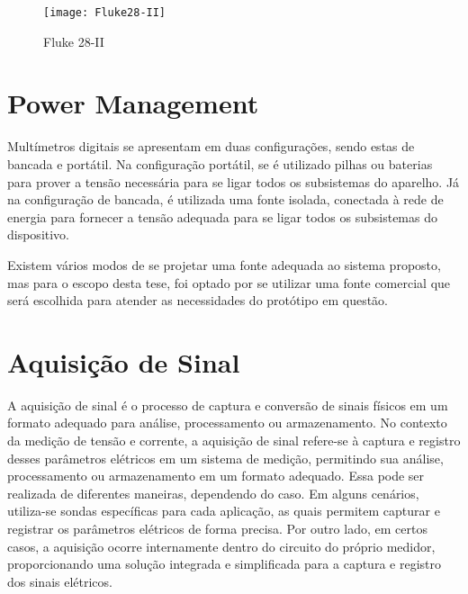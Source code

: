 \begin{figure}[htb]%
    \caption{Fluke 28-II}%
    \label{fig:Fluke28-II}%
    \texttt{[image: Fluke28-II]}%
\end{figure}

\section{Power Management}\label{powerManagement}

Multímetros digitais se apresentam em duas configurações, sendo estas de bancada e portátil. Na configuração portátil, se é utilizado pilhas ou baterias para prover a tensão necessária para se ligar todos os subsistemas do aparelho. Já na configuração de bancada, é utilizada uma fonte isolada, conectada à rede de energia para fornecer a tensão adequada para se ligar todos os subsistemas do dispositivo.

Existem vários modos de se projetar uma fonte adequada ao sistema proposto, mas para o escopo desta tese, foi optado por se utilizar uma fonte comercial que será escolhida para atender as necessidades do protótipo em questão.



\section{Aquisição de Sinal}\label{sec:aqSignal}

A aquisição de sinal é o processo de captura e conversão de sinais físicos em um formato adequado para análise, processamento ou armazenamento. No contexto da medição de tensão e corrente, a aquisição de sinal refere-se à captura e registro desses parâmetros elétricos em um sistema de medição, permitindo sua análise, processamento ou armazenamento em um formato adequado.
Essa pode ser realizada de diferentes maneiras, dependendo do caso. Em alguns cenários, utiliza-se sondas específicas para cada aplicação, as quais permitem capturar e registrar os parâmetros elétricos de forma precisa. Por outro lado, em certos casos, a aquisição ocorre internamente dentro do circuito do próprio medidor, proporcionando uma solução integrada e simplificada para a captura e registro dos sinais elétricos.

